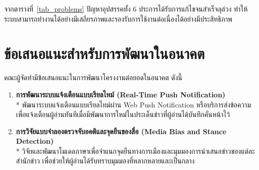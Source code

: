 จากตารางที่~\ref{tab_problems} ปัญหาอุปสรรคทั้ง 6 ประการได้รับการแก้ไขจนสำเร็จลุล่วง ทำให้ระบบสามารถทำงานได้อย่างมีเสถียรภาพและรองรับการใช้งานต่อเนื่องได้อย่างมีประสิทธิภาพ

\section{ข้อเสนอแนะสำหรับการพัฒนาในอนาคต}

คณะผู้จัดทำมีข้อเสนอแนะในการพัฒนาโครงงานต่อยอดในอนาคต ดังนี้

\begin{enumerate}[noitemsep,topsep=2pt]
    \item \textbf{การพัฒนาระบบแจ้งเตือนแบบเรียลไทม์ (Real-Time Push Notification)}\\*
    พัฒนาระบบแจ้งเตือนแบบเรียลไทม์ผ่าน Web Push Notification หรือบริการส่งข้อความ เพื่อแจ้งเตือนผู้อ่านทันทีเมื่อมีพัฒนาการใหม่ในประเด็นข่าวที่ผู้อ่านได้บันทึกคั่นหน้าไว้
    \item \textbf{การวิจัยแบบจำลองตรวจจับอคติและจุดยืนของสื่อ (Media Bias and Stance Detection)}\\*
    วิจัยและพัฒนาโมเดลภาษาเพื่อจำแนกจุดยืนทางการเมืองและมุมมองการนำเสนอข่าวของแต่ละสำนักข่าว เพื่อช่วยให้ผู้อ่านได้รับทราบมุมมองที่หลากหลายและเป็นกลาง
\end{enumerate}
